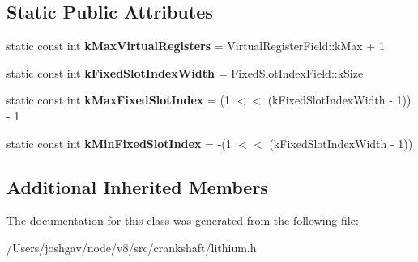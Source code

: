 \subsection*{Static Public Attributes}
\begin{DoxyCompactItemize}
\item 
static const int {\bfseries k\+Max\+Virtual\+Registers} = Virtual\+Register\+Field\+::k\+Max + 1\hypertarget{classv8_1_1internal_1_1_l_unallocated_a74a05ec5d4c76ae15d49d160d4d4009b}{}\label{classv8_1_1internal_1_1_l_unallocated_a74a05ec5d4c76ae15d49d160d4d4009b}

\item 
static const int {\bfseries k\+Fixed\+Slot\+Index\+Width} = Fixed\+Slot\+Index\+Field\+::k\+Size\hypertarget{classv8_1_1internal_1_1_l_unallocated_aa4a4b055aaeec6f7a10122a6cddf53a9}{}\label{classv8_1_1internal_1_1_l_unallocated_aa4a4b055aaeec6f7a10122a6cddf53a9}

\item 
static const int {\bfseries k\+Max\+Fixed\+Slot\+Index} = (1 $<$$<$ (k\+Fixed\+Slot\+Index\+Width -\/ 1)) -\/ 1\hypertarget{classv8_1_1internal_1_1_l_unallocated_ad715869b332be98feff8e3a82ffa81bc}{}\label{classv8_1_1internal_1_1_l_unallocated_ad715869b332be98feff8e3a82ffa81bc}

\item 
static const int {\bfseries k\+Min\+Fixed\+Slot\+Index} = -\/(1 $<$$<$ (k\+Fixed\+Slot\+Index\+Width -\/ 1))\hypertarget{classv8_1_1internal_1_1_l_unallocated_a1b02a7bd7de114b94d3b59d331547645}{}\label{classv8_1_1internal_1_1_l_unallocated_a1b02a7bd7de114b94d3b59d331547645}

\end{DoxyCompactItemize}
\subsection*{Additional Inherited Members}


The documentation for this class was generated from the following file\+:\begin{DoxyCompactItemize}
\item 
/\+Users/joshgav/node/v8/src/crankshaft/lithium.\+h\end{DoxyCompactItemize}
